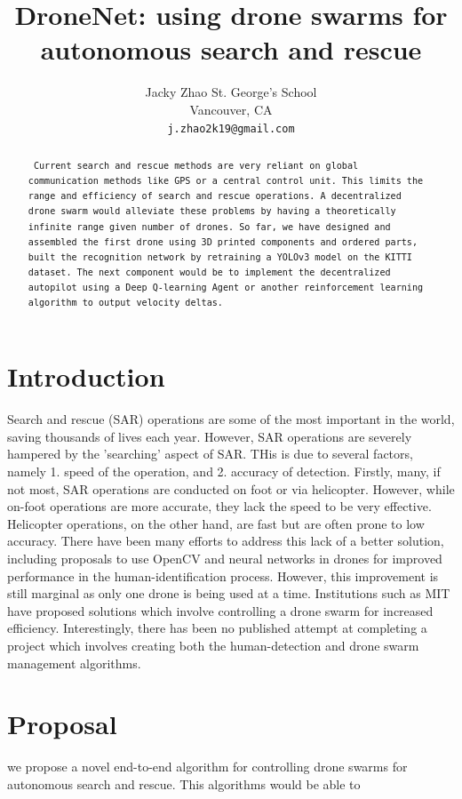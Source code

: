 \documentclass{article}
\title{DroneNet: using drone swarms for autonomous search and rescue}
\author{
  Jacky Zhao
  St. George's School\\
  Vancouver, CA\\
  \texttt{j.zhao2k19@gmail.com} \\
}
\begin{document}
\maketitle

\begin{abstract}
\texttt{
Current search and rescue methods are very reliant on global communication methods like GPS or a central control unit. This limits the range and efficiency of search and rescue operations. A decentralized drone swarm would alleviate these problems by having a theoretically infinite range given number of drones. So far, we have designed and assembled the first drone using 3D printed components and ordered parts, built the recognition network by retraining a YOLOv3 model on the KITTI dataset. The next component would be to implement the decentralized autopilot using a Deep Q-learning Agent or another reinforcement learning algorithm to output velocity deltas. 
} \\
\end{abstract}


\section{Introduction}
Search and rescue (SAR) operations are some of the most important in the world, saving thousands of lives each year. However, SAR operations are severely hampered by the 'searching' aspect of SAR. THis is due to several factors, namely 1. speed of the operation, and 2. accuracy of detection. Firstly, many, if not most, SAR operations are conducted on foot or via helicopter. However, while on-foot operations are more accurate, they lack the speed to be very effective. Helicopter operations, on the other hand, are fast but are often prone to low accuracy. There have been many efforts to address this lack of a better solution, including proposals to use OpenCV and neural networks in drones for improved performance in the human-identification process. However, this improvement is still marginal as only one drone is being used at a time. Institutions such as MIT have proposed solutions which involve controlling a drone swarm for increased efficiency. Interestingly, there has been no published attempt at completing a project which involves creating both the human-detection and drone swarm management algorithms.

\section{Proposal}
\label{sec:headings}
we propose a novel end-to-end algorithm for controlling drone swarms for autonomous search and rescue. This algorithms would be able to
\end{document}
